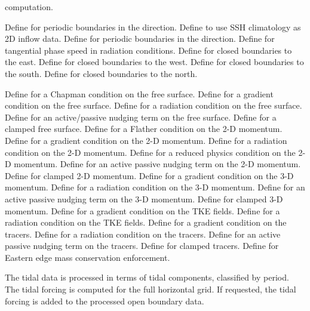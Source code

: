\begin{klist}
\begin{klist}
	computation.
      \end{klist}
   \mbox{}
  \begin{klist}
       Define for periodic boundaries in the
    direction.
           Define to use SSH climatology as 2D inflow
   data.
       Define for periodic boundaries in the
    direction.
       Define for tangential phase speed in
     radiation conditions.
       Define for closed boundaries to the east.
       Define for closed boundaries to the west.
       Define for closed boundaries to the south.
       Define for closed boundaries to the north.
  \end{klist}
   \mbox{}
  \begin{klist}
       Define for a Chapman
   condition on the free surface.
       Define for a gradient
   condition on the free surface.
       Define for a radiation
   condition on the free surface.
       Define for an active/passive nudging term
   on the free surface.
       Define for a clamped free surface.
       Define for a Flather
   condition on the 2-D momentum.
       Define for a gradient
   condition on the 2-D momentum.
       Define for a radiation
   condition on the 2-D momentum.
       Define for a reduced physics
   condition on the 2-D momentum.
       Define for an active passive nudging term
   on the 2-D momentum.
       Define for clamped 2-D momentum.
       Define for a gradient
   condition on the 3-D momentum.
       Define for a radiation
   condition on the 3-D momentum.
       Define for an active passive nudging term
   on the 3-D momentum.
       Define for clamped 3-D momentum.
       Define for a gradient
   condition on the TKE fields.
       Define for a radiation
   condition on the TKE fields.
       Define for a gradient
   condition on the tracers.
       Define for a radiation
   condition on the tracers.
       Define for an active passive nudging term
   on the tracers.
       Define for clamped tracers.
       Define for Eastern edge mass conservation
   enforcement.
  \end{klist}
   \mbox{}
The tidal data is processed in terms of tidal components, classified by
period. The tidal forcing is computed for the full horizontal grid.
If requested, the tidal forcing is added to the processed open
boundary data.


\end{klist}
